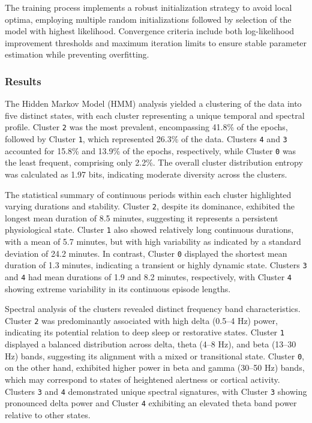 \documentclass[a4paper,12pt,twoside]{article}
\begin{document}
The training process implements a robust initialization strategy to avoid local optima, employing multiple random initializations followed by selection of the model with highest likelihood. Convergence criteria include both log-likelihood improvement thresholds and maximum iteration limits to ensure stable parameter estimation while preventing overfitting.

\subsubsection{Results}

The Hidden Markov Model (HMM) analysis yielded a clustering of the data into five distinct states, with each cluster representing a unique temporal and spectral profile. Cluster \texttt{2} was the most prevalent, encompassing 41.8\% of the epochs, followed by Cluster \texttt{1}, which represented 26.3\% of the data. Clusters \texttt{4} and \texttt{3} accounted for 15.8\% and 13.9\% of the epochs, respectively, while Cluster \texttt{0} was the least frequent, comprising only 2.2\%. The overall cluster distribution entropy was calculated as 1.97 bits, indicating moderate diversity across the clusters.

The statistical summary of continuous periods within each cluster highlighted varying durations and stability. Cluster \texttt{2}, despite its dominance, exhibited the longest mean duration of 8.5 minutes, suggesting it represents a persistent physiological state. Cluster \texttt{1} also showed relatively long continuous durations, with a mean of 5.7 minutes, but with high variability as indicated by a standard deviation of 24.2 minutes. In contrast, Cluster \texttt{0} displayed the shortest mean duration of 1.3 minutes, indicating a transient or highly dynamic state. Clusters \texttt{3} and \texttt{4} had mean durations of 1.9 and 8.2 minutes, respectively, with Cluster \texttt{4} showing extreme variability in its continuous episode lengths.

Spectral analysis of the clusters revealed distinct frequency band characteristics. Cluster \texttt{2} was predominantly associated with high delta (0.5–4 Hz) power, indicating its potential relation to deep sleep or restorative states. Cluster \texttt{1} displayed a balanced distribution across delta, theta (4–8 Hz), and beta (13–30 Hz) bands, suggesting its alignment with a mixed or transitional state. Cluster \texttt{0}, on the other hand, exhibited higher power in beta and gamma (30–50 Hz) bands, which may correspond to states of heightened alertness or cortical activity. Clusters \texttt{3} and \texttt{4} demonstrated unique spectral signatures, with Cluster \texttt{3} showing pronounced delta power and Cluster \texttt{4} exhibiting an elevated theta band power relative to other states.
\end{document}
